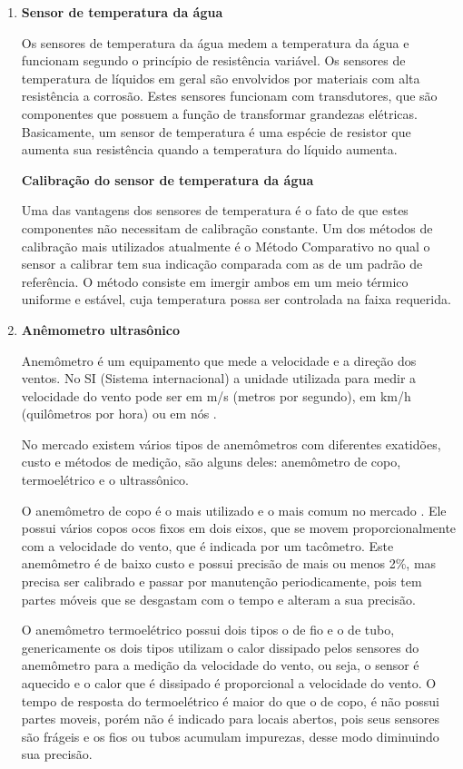 \begin{enumerate}
    \item \textbf{Sensor de temperatura da água}
	
	Os sensores de temperatura da água medem a temperatura da água e funcionam segundo o princípio de resistência variável.
	Os sensores de temperatura de líquidos em geral são envolvidos por materiais com alta resistência a corrosão.
	Estes sensores funcionam com transdutores, que são componentes que possuem a função de transformar grandezas elétricas.
	Basicamente, um sensor de temperatura é uma espécie de resistor que aumenta sua resistência quando a temperatura do
	líquido aumenta.
	
	\begin{center}
	 \textbf{Calibração do sensor de temperatura da água}
	\end{center}
	
	Uma das vantagens dos sensores de temperatura é o fato de que estes componentes não necessitam de calibração constante.
	Um dos métodos de calibração mais utilizados atualmente é o Método Comparativo no qual o sensor a calibrar tem sua
	indicação comparada com as de um padrão de referência. O método consiste em imergir ambos em um meio térmico uniforme
	e estável, cuja temperatura possa ser controlada na faixa requerida.
	
    \item \textbf{Anêmometro ultrasônico}
    
	Anemômetro é um equipamento que mede a velocidade e a direção dos ventos. No SI (Sistema internacional) a unidade
	utilizada para medir a velocidade do vento pode ser em m/s (metros por segundo), em km/h (quilômetros por hora) ou
	em nós \cite{almeida04}.
	
	No mercado existem vários tipos de anemômetros com diferentes exatidões, custo e métodos de medição, são alguns deles: 
	anemômetro de copo, termoelétrico e o ultrassônico.
	
	O anemômetro de copo é o mais utilizado e o mais comum no mercado \cite{cyliax06}. Ele possui vários copos ocos
	fixos em dois eixos, que se movem proporcionalmente com a velocidade do vento, que é indicada por um tacômetro. Este
	anemômetro é de baixo custo e possui precisão de mais ou menos 2\%, mas precisa ser calibrado e passar por manutenção
	periodicamente, pois tem partes móveis que se desgastam com o tempo e alteram a sua precisão.
	
	O anemômetro termoelétrico possui dois tipos o de fio e o de tubo, genericamente os dois tipos utilizam o calor dissipado
	pelos sensores do anemômetro para a medição da velocidade do vento, ou seja, o sensor é aquecido e o calor que é dissipado
	é proporcional a velocidade do vento.  O tempo de resposta do termoelétrico é maior do que o de copo, é não possui partes
	moveis, porém não é indicado para locais abertos, pois seus sensores são frágeis e os fios ou tubos acumulam impurezas,
	desse modo diminuindo sua precisão.
	

\end{enumerate}

